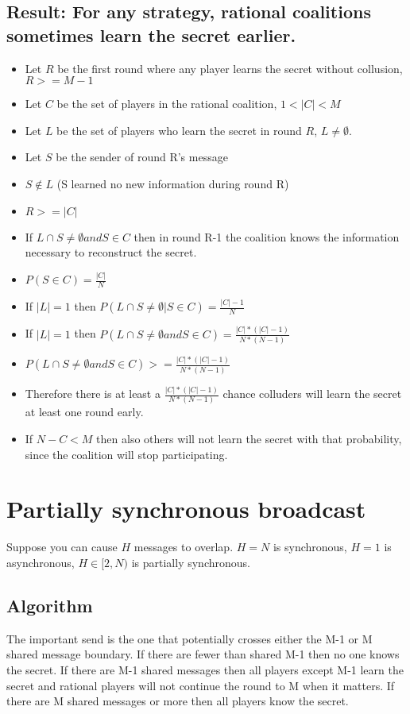 \documentclass{article}
\begin{document}
\subsection{Result: For any strategy, rational coalitions sometimes learn the secret earlier.}
\begin{itemize}
\item Let $R$ be the first round where any player learns the secret without collusion, $R >= M-1$
\item Let $C$ be the set of players in the rational coalition, $1 < |C| < M$
\item Let $L$ be the set of players who learn the secret in round $R$, $L \not = \emptyset$.
\item Let $S$ be the sender of round R's message
\item $S \not \in L$ (S learned no new information during round R)
\item $R >= |C|$
\item If $L \cap S \not = \emptyset and S \in C$ then in round R-1 the coalition knows the information necessary to reconstruct the secret.
\item $P(S \in C) = \frac{|C|}{N}$
\item If $|L| = 1$ then $P(L \cap S \not = \emptyset | S \in C) = \frac{|C|-1}{N}$
\item If $|L| = 1$ then $P(L \cap S \not = \emptyset and S \in C) = \frac{|C|*(|C|-1)}{N*(N-1)}$
\item $P(L \cap S \not = \emptyset and S \in C) >= \frac{|C|*(|C|-1)}{N*(N-1)}$
\item Therefore there is at least a $\frac{|C|*(|C|-1)}{N*(N-1)}$ chance colluders will learn the secret at least one round early.
\item If $N - C < M$ then also others will not learn the secret with that probability, since the coalition will stop participating. 
\end{itemize}

\section{Partially synchronous broadcast}

Suppose you can cause $H$  messages to overlap. $H = N$ is synchronous, $H = 1$ is asynchronous, $H \in [2, N)$ is partially synchronous.

\subsection{Algorithm}
The important send is the one that potentially crosses either the M-1 or M shared message boundary. If there are fewer than shared M-1 then no one knows the secret. If there are M-1 shared messages then all players except M-1 learn the secret and rational players will not continue the round to M when it matters. If there are M shared messages or more then all players know the secret.
\end{document}
